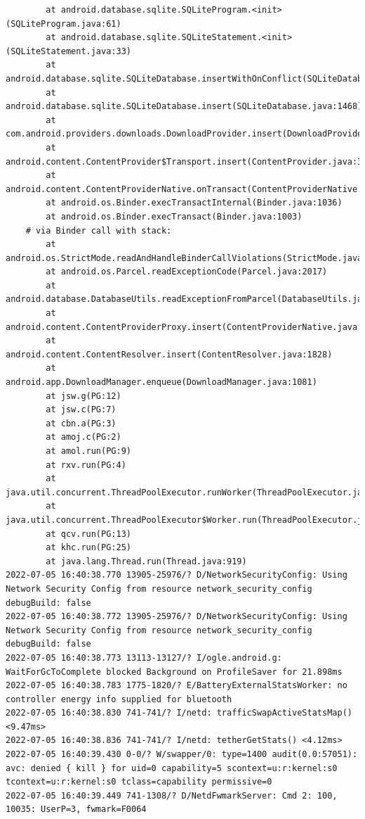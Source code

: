 \documentclass[a4paper,12pt]{book}
\begin{document}
\begin{lstlisting}
        at android.database.sqlite.SQLiteProgram.<init>(SQLiteProgram.java:61)
        at android.database.sqlite.SQLiteStatement.<init>(SQLiteStatement.java:33)
        at android.database.sqlite.SQLiteDatabase.insertWithOnConflict(SQLiteDatabase.java:1597)
        at android.database.sqlite.SQLiteDatabase.insert(SQLiteDatabase.java:1468)
        at com.android.providers.downloads.DownloadProvider.insert(DownloadProvider.java:972)
        at android.content.ContentProvider$Transport.insert(ContentProvider.java:309)
        at android.content.ContentProviderNative.onTransact(ContentProviderNative.java:154)
        at android.os.Binder.execTransactInternal(Binder.java:1036)
        at android.os.Binder.execTransact(Binder.java:1003)
    # via Binder call with stack:
        at android.os.StrictMode.readAndHandleBinderCallViolations(StrictMode.java:2289)
        at android.os.Parcel.readExceptionCode(Parcel.java:2017)
        at android.database.DatabaseUtils.readExceptionFromParcel(DatabaseUtils.java:137)
        at android.content.ContentProviderProxy.insert(ContentProviderNative.java:481)
        at android.content.ContentResolver.insert(ContentResolver.java:1828)
        at android.app.DownloadManager.enqueue(DownloadManager.java:1081)
        at jsw.g(PG:12)
        at jsw.c(PG:7)
        at cbn.a(PG:3)
        at amoj.c(PG:2)
        at amol.run(PG:9)
        at rxv.run(PG:4)
        at java.util.concurrent.ThreadPoolExecutor.runWorker(ThreadPoolExecutor.java:1167)
        at java.util.concurrent.ThreadPoolExecutor$Worker.run(ThreadPoolExecutor.java:641)
        at qcv.run(PG:13)
        at khc.run(PG:25)
        at java.lang.Thread.run(Thread.java:919)
2022-07-05 16:40:38.770 13905-25976/? D/NetworkSecurityConfig: Using Network Security Config from resource network_security_config debugBuild: false
2022-07-05 16:40:38.772 13905-25976/? D/NetworkSecurityConfig: Using Network Security Config from resource network_security_config debugBuild: false
2022-07-05 16:40:38.773 13113-13127/? I/ogle.android.g: WaitForGcToComplete blocked Background on ProfileSaver for 21.898ms
2022-07-05 16:40:38.783 1775-1820/? E/BatteryExternalStatsWorker: no controller energy info supplied for bluetooth
2022-07-05 16:40:38.830 741-741/? I/netd: trafficSwapActiveStatsMap() <9.47ms>
2022-07-05 16:40:38.836 741-741/? I/netd: tetherGetStats() <4.12ms>
2022-07-05 16:40:39.430 0-0/? W/swapper/0: type=1400 audit(0.0:57051): avc: denied { kill } for uid=0 capability=5 scontext=u:r:kernel:s0 tcontext=u:r:kernel:s0 tclass=capability permissive=0
2022-07-05 16:40:39.449 741-1308/? D/NetdFwmarkServer: Cmd 2: 100, 10035: UserP=3, fwmark=F0064

\end{lstlisting}
\end{document}
